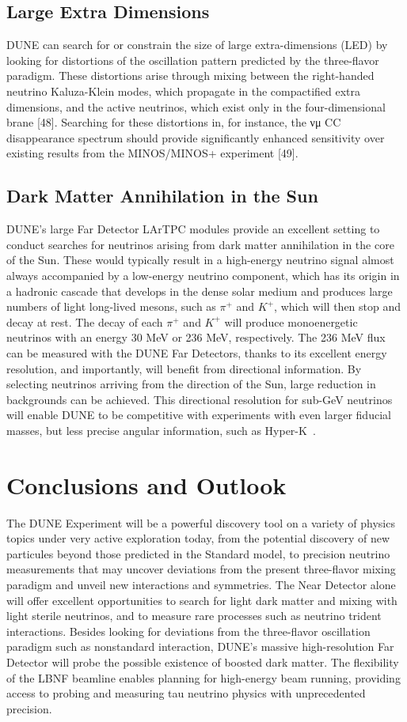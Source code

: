 \subsection{Large Extra Dimensions}
DUNE can search for or constrain the size of large extra-dimensions (LED) by looking for distortions of the oscillation pattern predicted by the three-flavor paradigm. These distortions arise through mixing between the right-handed neutrino Kaluza-Klein modes, which propagate in the compactified extra dimensions, and the active neutrinos, which exist only in the four-dimensional brane [48]. Searching for these distortions in, for instance, the νμ CC disappearance spectrum should provide significantly enhanced sensitivity over existing results from the MINOS/MINOS+ experiment [49].

\subsection{Dark Matter Annihilation in the Sun}
DUNE's large Far Detector LArTPC modules provide an excellent setting to conduct searches for neutrinos arising from dark matter annihilation in the core of the Sun. These would typically result in a high-energy neutrino signal almost always accompanied by a low-energy neutrino component, which has its origin in a hadronic cascade that
develops in the dense solar medium and produces large numbers of light long-lived mesons, such as $\pi^+$ and $K^+$, which will then stop and decay at rest. The decay of each $\pi^+$ and $K^+$ will
produce monoenergetic neutrinos with an energy 30 MeV or 236 MeV, respectively.
The 236 MeV flux can be measured with the DUNE Far Detectors, thanks to its excellent energy resolution, and importantly, will benefit from directional information. By selecting neutrinos arriving from the direction of the Sun, large reduction in backgrounds can be achieved.
This directional resolution for sub-GeV neutrinos will enable DUNE to be competitive with experiments with even larger fiducial masses, but less precise angular information, such as Hyper-K~\cite{ref:DMannihilation}.

\section{Conclusions and Outlook}
The DUNE Experiment will be a powerful discovery tool on a variety of physics topics under very active exploration today, from the potential discovery of new particules beyond those predicted in the Standard model, to precision neutrino measurements that may uncover deviations from the present three-flavor mixing paradigm and unveil new interactions and symmetries.
The Near Detector alone will offer excellent opportunities to search for light dark matter and mixing with light sterile neutrinos, and to measure rare processes such as neutrino trident interactions. Besides looking for deviations from the three-flavor oscillation paradigm such as nonstandard interaction, DUNE's massive high-resolution Far Detector will probe  the possible existence of boosted dark matter. The flexibility of the LBNF beamline enables planning for high-energy beam running, providing access to probing and measuring tau neutrino physics with unprecedented precision.

